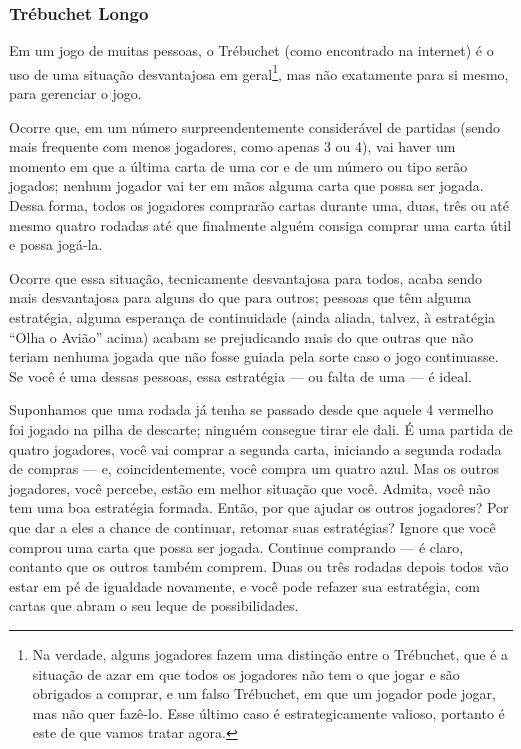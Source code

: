 \subsubsection{Trébuchet Longo}

Em um jogo de muitas pessoas, o Trébuchet (como encontrado na internet) é o uso de uma situação desvantajosa em geral\footnote{Na verdade, alguns jogadores fazem uma distinção entre o Trébuchet, que é a situação de azar em que todos os jogadores não tem o que jogar e são obrigados a comprar, e um falso Trébuchet, em que um jogador pode jogar, mas não quer fazê-lo. Esse último caso é estrategicamente valioso, portanto é este de que vamos tratar agora.}, mas não exatamente para si mesmo, para gerenciar o jogo.

Ocorre que, em um número surpreendentemente considerável de partidas (sendo mais frequente com menos jogadores, como apenas 3 ou 4), vai haver um momento em que a última carta de uma cor e de um número ou tipo serão jogados; nenhum jogador vai ter em mãos alguma carta que possa ser jogada. Dessa forma, todos os jogadores comprarão cartas durante uma, duas, três ou até mesmo quatro rodadas até que finalmente alguém consiga comprar uma carta útil e possa jogá-la.

Ocorre que essa situação, tecnicamente desvantajosa para todos, acaba sendo mais desvantajosa para alguns do que para outros; pessoas que têm alguma estratégia, alguma esperança de continuidade (ainda aliada, talvez, à estratégia ``Olha o Avião'' acima) acabam se prejudicando mais do que outras que não teriam nenhuma jogada que não fosse guiada pela sorte caso o jogo continuasse. Se você é uma dessas pessoas, essa estratégia --- ou falta de uma --- é ideal.

Suponhamos que uma rodada já tenha se passado desde que aquele 4 vermelho foi jogado na pilha de descarte; ninguém consegue tirar ele dali. É uma partida de quatro jogadores, você vai comprar a segunda carta, iniciando a segunda rodada de compras --- e, coincidentemente, você compra um quatro azul. Mas os outros jogadores, você percebe, estão em melhor situação que você. Admita, você não tem uma boa estratégia formada. Então, por que ajudar os outros jogadores? Por que dar a eles a chance de continuar, retomar suas estratégias? Ignore que você comprou uma carta que possa ser jogada. Continue comprando --- é claro, contanto que os outros também comprem. Duas ou três rodadas depois todos vão estar em pé de igualdade novamente, e você pode refazer sua estratégia, com cartas que abram o seu leque de possibilidades.

